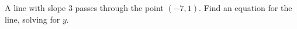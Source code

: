 A line with slope 3 passes through the point $(-7,1)$. Find
an equation for the line, solving for $y$.\answercheck

